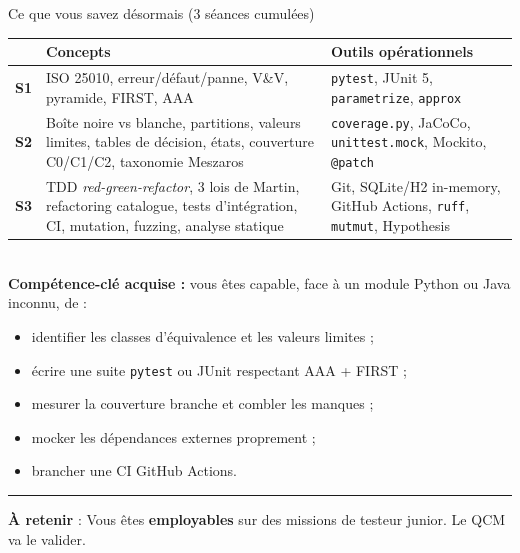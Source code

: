 \documentclass[aspectratio=169,11pt]{beamer}
\newcommand{\takeaway}[1]{%
\vfill\begin{beamercolorbox}[wd=\linewidth,sep=0.4em]{}
\color{accent2}\rule[0.6ex]{1.2em}{1.2pt}\hspace{0.4em}%
\textbf{\color{accent2}\small À retenir} \textcolor{textsoft}{:} %
{\small\color{textmain}#1}
\end{beamercolorbox}}
\begin{document}
\begin{frame}[t,shrink=10]{Ce que vous savez désormais (3 séances cumulées)}
\footnotesize
\begin{tabular}{@{}p{1.3cm} p{7.4cm} p{7.8cm}@{}}
\toprule
\textbf{} & \textbf{\color{accent}Concepts} & \textbf{\color{accent2}Outils opérationnels} \\
\midrule
\textbf{S1} & ISO 25010, erreur/défaut/panne, V\&V, pyramide, FIRST, AAA
& \texttt{pytest}, JUnit 5, \texttt{parametrize}, \texttt{approx} \\
\addlinespace[0.15em]
\textbf{S2} & Boîte noire vs blanche, partitions, valeurs limites, tables de décision, états, couverture C0/C1/C2, taxonomie Meszaros
& \texttt{coverage.py}, JaCoCo, \texttt{unittest.mock}, Mockito, \texttt{@patch} \\
\addlinespace[0.15em]
\textbf{S3} & TDD \emph{red-green-refactor}, 3 lois de Martin, refactoring catalogue, tests d'intégration, CI, mutation, fuzzing, analyse statique
& Git, SQLite/H2 in-memory, GitHub Actions, \texttt{ruff}, \texttt{mutmut}, Hypothesis \\
\bottomrule
\end{tabular}
\\
\vspace{0.5cm}
\textbf{Compétence-clé acquise :} vous êtes capable, face à un module Python ou Java inconnu, de :
\begin{itemize}\itemsep0.05em
\item identifier les classes d'équivalence et les valeurs limites ;
\item écrire une suite \texttt{pytest} ou JUnit respectant AAA + FIRST ;
\item mesurer la couverture branche et combler les manques ;
\item mocker les dépendances externes proprement ;
\item brancher une CI GitHub Actions.
\end{itemize}
\takeaway{Vous êtes \textbf{employables} sur des missions de testeur junior. Le QCM va le valider.}
\end{frame}
\end{document}
